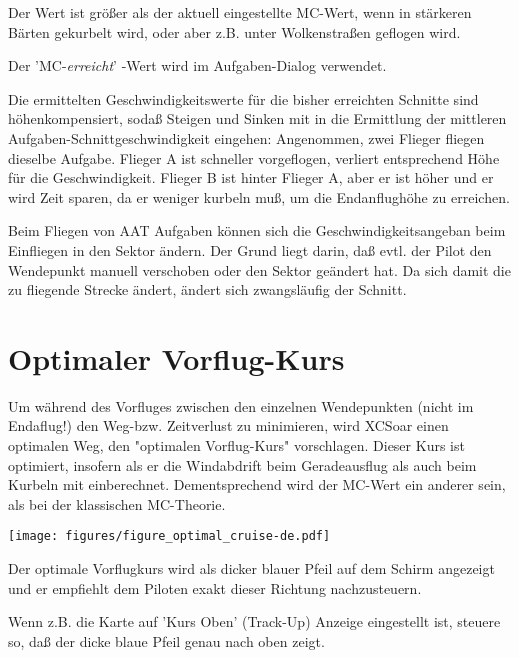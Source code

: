 Der Wert ist größer als der aktuell eingestellte MC-Wert, wenn in stärkeren Bärten gekurbelt
wird, oder aber z.B. unter Wolkenstraßen geflogen wird.

Der 'MC-\emph{erreicht}' -Wert wird im Aufgaben-Dialog verwendet.

Die ermittelten Geschwindigkeitswerte für die bisher erreichten Schnitte sind höhenkompensiert,
sodaß Steigen und Sinken mit in die Ermittlung der mittleren Aufgaben-Schnittgeschwindigkeit eingehen:
Angenommen, zwei Flieger fliegen dieselbe Aufgabe.
Flieger A ist schneller vorgeflogen, verliert entsprechend Höhe für die Geschwindigkeit.
Flieger B ist hinter Flieger A, aber er ist höher und er wird Zeit sparen, da er weniger kurbeln muß, um
die Endanflughöhe zu erreichen.

Beim Fliegen von AAT Aufgaben können sich die Geschwindigkeitsangeban beim Einfliegen in
den Sektor ändern. Der Grund liegt darin,  daß evtl. der Pilot den Wendepunkt manuell
verschoben  oder den Sektor geändert hat. Da sich damit die zu fliegende Strecke ändert,
ändert sich zwangsläufig der Schnitt.


\section{Optimaler Vorflug-Kurs}

Um während des Vorfluges zwischen den einzelnen Wendepunkten (nicht im Endaflug!) den Weg-bzw.
Zeitverlust zu minimieren, wird \textsf{XCSoar} einen optimalen Weg, den "optimalen Vorflug-Kurs"
vorschlagen. Dieser Kurs ist optimiert, insofern als er die Windabdrift beim Geradeausflug als auch beim
Kurbeln mit einberechnet. Dementsprechend wird der MC-Wert ein anderer sein, als bei der klassischen
MC-Theorie.


\begin{center}
\begin{maxipage}
\centering
\def\svgwidth{0.8\linewidth}
\texttt{[image: figures/figure\_optimal\_cruise-de.pdf]}
\end{maxipage}
\end{center}

Der optimale Vorflugkurs wird als dicker blauer Pfeil auf dem Schirm angezeigt und er empfiehlt dem Piloten
exakt dieser Richtung nachzusteuern.

Wenn z.B. die Karte auf 'Kurs Oben'  (Track-Up) Anzeige eingestellt ist, steuere so, daß der dicke blaue Pfeil
genau nach oben zeigt.

